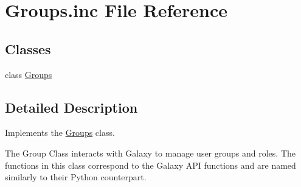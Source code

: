 \hypertarget{Groups_8inc}{}\section{Groups.\+inc File Reference}
\label{Groups_8inc}
\subsection*{Classes}
\begin{DoxyCompactItemize}
\item 
class \hyperlink{classGroups}{Groups}
\end{DoxyCompactItemize}


\subsection{Detailed Description}
Implements the \hyperlink{classGroups}{Groups} class.

The Group Class interacts with Galaxy to manage user groups and roles. The functions in this class correspond to the Galaxy A\+PI functions and are named similarly to their Python counterpart. 